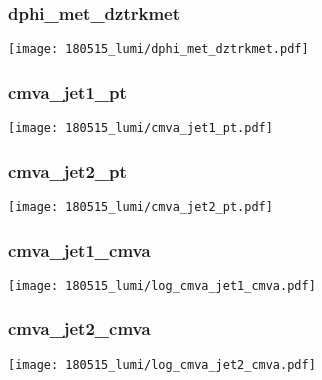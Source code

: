 \begin{frame}
   \frametitle{\small dphi\_met\_dztrkmet}
   \centering
   \texttt{[image: 180515\_lumi/dphi\_met\_dztrkmet.pdf]}
\end{frame}

\begin{frame}
   \frametitle{\small cmva\_jet1\_pt}
   \centering
   \texttt{[image: 180515\_lumi/cmva\_jet1\_pt.pdf]}
\end{frame}

\begin{frame}
   \frametitle{\small cmva\_jet2\_pt}
   \centering
   \texttt{[image: 180515\_lumi/cmva\_jet2\_pt.pdf]}
\end{frame}

\begin{frame}
   \frametitle{\small cmva\_jet1\_cmva}
   \centering
   \texttt{[image: 180515\_lumi/log\_cmva\_jet1\_cmva.pdf]}
\end{frame}

\begin{frame}
   \frametitle{\small cmva\_jet2\_cmva}
   \centering
   \texttt{[image: 180515\_lumi/log\_cmva\_jet2\_cmva.pdf]}
\end{frame}
